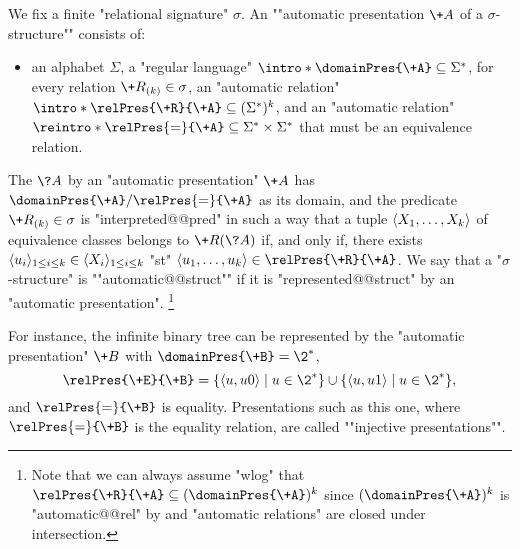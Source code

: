 We fix a finite "relational signature" $\sigma$.
An \AP""automatic presentation $\+A$ of a $\sigma$-structure"" consists of:
\begin{itemize}
	\item an alphabet $\Sigma$,
	\itemAP a "regular language" $\intro*\domainPres{\+A} \subseteq \Sigma^*$,
	\itemAP for every relation $\+R_{(k)} \in \sigma$, an
		"automatic relation" $\intro*\relPres{\+R}{\+A} \subseteq (\Sigma^*)^k$, and
	\itemAP an "automatic relation" $\reintro*\relPres{=}{\+A} \subseteq
		\Sigma^* \times \Sigma^*$ that must be an equivalence relation. 
\end{itemize} 
The \AP{} $\?A$ by an "automatic presentation" $\+A$ has
$\domainPres{\+A}/{\relPres{=}{\+A}}$ as its domain, and the predicate $\+R_{(k)} \in \sigma$
is "interpreted@@pred" in such a way that a tuple $\langle X_1,\hdots,X_k\rangle$ of equivalence classes
belongs to $\+R(\?A)$ if, and only if, there exists $\langle u_i\rangle_{1 \leq i \leq k} \in\langle X_i\rangle_{1 \leq i \leq k}$ "st" $\tup{u_1,\hdots,u_k} \in \relPres{\+R}{\+A}$.
We say that a "$\sigma$-structure" is ""automatic@@struct"" if it is
"represented@@struct" by an "automatic presentation".%
\footnote{Note that we can always assume "wlog" that $\relPres{\+R}{\+A} \subseteq
(\domainPres{\+A})^k$ since $(\domainPres{\+A})^k$ is "automatic@@rel" by
 and "automatic relations" are closed under intersection.}

For instance, the infinite binary tree can be represented by the "automatic presentation"
$\+B$ with $\domainPres{\+B} = \2^*$,
\[
	\relPres{\+E}{\+B} =
	\{\tup{u,u0} \mid u \in \2^*\} \cup \{\tup{u,u1} \mid u \in \2^*\},
\]
and $\relPres{=}{\+B}$ is equality.
Presentations such as this one, where $\relPres{=}{\+B}$ is the equality relation,
are called ""injective presentations"".

